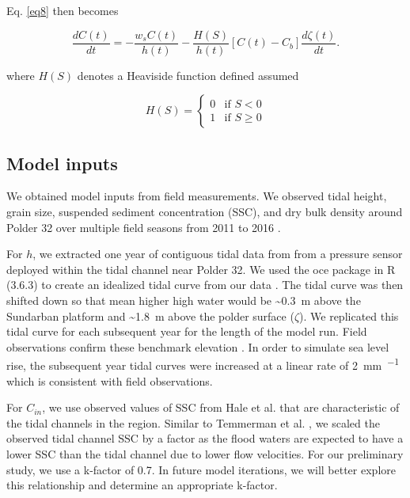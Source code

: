 \documentclass[a4paper,fleqn]{cas-dc}
\begin{document}
Eq. \ref{eq8} then becomes

\begin{equation}\label{eq9}
	\frac{dC(t)}{dt} = - \frac{w_s C(t)}{h(t)} - \frac{H(S)}{h(t)} [C(t) - C_b] \frac{d\zeta(t)}{dt}.
\end{equation}

where $H(S)$ denotes a Heaviside function defined assumed

\begin{equation}\label{eq8}
	H(S) = 
  \begin{cases}
    0 & \text{if $S < 0$}\\
    1 & \text{if $S \geq 0$}
  \end{cases}
\end{equation}

\subsection{Model inputs}

We obtained model inputs from field measurements. We observed tidal height, grain size, suspended sediment concentration (SSC), and dry bulk density around Polder 32 over multiple field seasons from 2011 to 2016 \citet{auerbachFloodRiskNatural2015,haleObservationsScalingTidal2019,haleSeasonalVariabilityForces2019}.

For $h$, we extracted one year of contiguous tidal data from from a pressure sensor deployed within the tidal channel near Polder 32. We used the oce package in R (3.6.3) to create an idealized tidal curve from our data \citet{kelleyOceAnalysisOceanographic2020}. The tidal curve was then shifted down so that mean higher high water would be \SI{~0.3}{\meter} above the Sundarban platform and \SI{~1.8}{\meter} above the polder surface ($\zeta$). We replicated this tidal curve for each subsequent year for the length of the model run. Field observations confirm these benchmark elevation \citet{auerbachFloodRiskNatural2015,haleSeasonalVariabilityForces2019,bomerSurfaceElevationSedimentation2020}. In order to simulate sea level rise, the subsequent year tidal curves were increased at a linear rate of \SI{2}{\milli\meter\per\year} which is consistent with field observations.


For $C_{in}$, we use observed values of SSC from Hale et al. \citet{haleObservationsScalingTidal2019} that are characteristic of the tidal channels in the region. Similar to Temmerman et al. \citet{temmermanModellingLongtermTidal2003,temmermanModellingEstuarineVariations2004}, we scaled the observed tidal channel SSC by a factor as the flood waters are expected to have a lower SSC than the tidal channel due to lower flow velocities. For our preliminary study, we use a k-factor of 0.7. In future model iterations, we will better explore this relationship and determine an appropriate k-factor.
\end{document}
